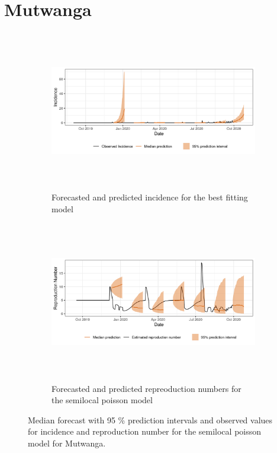  \section{ Mutwanga }\begin{figure}[H]\begin{subfigure}{\textwidth}  \centering  \includegraphics[width=0.9\linewidth, height=7cm]{../output/Mutwanga_predictions.png}  \caption{Forecasted and predicted incidence for the best fitting model}\end{subfigure}

\begin{subfigure}{\textwidth}  \centering  \includegraphics[width=0.9\linewidth, height=7cm]{../output/Mutwanga_Rs.png}  \caption{Forecasted and predicted repreoduction numbers for the semilocal poisson model}\end{subfigure}  \caption{Median forecast with 95 \% prediction intervals and observed values for incidence and reproduction number for the semilocal poisson model for Mutwanga.}\end{figure}

